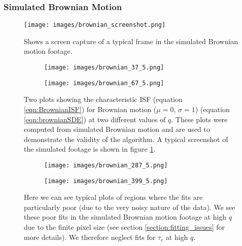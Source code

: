 \documentclass[10pt]{article}
\begin{document}
\subsubsection{Simulated Brownian Motion}
\begin{figure}[H]
  \centering
  \texttt{[image: images/brownian\_screenshot.png]}
  \caption{Shows a screen capture of a typical frame in the simulated Brownian motion footage.}
  \label{fig:simulated_brownian_screenshot}
\end{figure}

\begin{figure}[H]
\begin{subfigure}[t]{.47\textwidth}
  \centering
  \texttt{[image: images/brownian\_37\_5.png]}
  \label{fig:simulated_brownian1_37_5}
\end{subfigure}%
\hfill
\begin{subfigure}[t]{.47\textwidth}
  \centering
  \texttt{[image: images/brownian\_67\_5.png]}
 \label{fig:simulated_brownian1_67_5}
\end{subfigure}
\caption{Two plots showing the characteristic ISF (equation \ref{eqn:BrownianISF}) for Brownian motion ($\mu = 0$, $\sigma = 1$) (equation \ref{eqn:brownianSDE}) at two different values of $q$. These plots were computed from simulated Brownian motion and are used to demonstrate the validity of the algorithm. A typical screenshot of the simulated footage is shown in figure \ref{fig:simulated_brownian_screenshot}.}
\label{fig:simulated_brownian1}
\end{figure}

\begin{figure}[H]
\begin{subfigure}[t]{.5\textwidth}
  \centering
  \texttt{[image: images/brownian\_287\_5.png]}
  \label{fig:simulated_brownian1_37_5}
\end{subfigure}%
\hfill
\begin{subfigure}[t]{.5\textwidth}
  \centering
  \texttt{[image: images/brownian\_399\_5.png]}
 \label{fig:simulated_brownian1_67_5}
\end{subfigure}
\caption{Here we can see typical plots of regions where the fits are particularly poor (due to the very noisy nature of the data). We see these poor fits in the simulated Brownian motion footage at high $q$ due to the finite pixel size (see section \ref{section:fitting_issues} for more details). We therefore neglect fits for $\tau_c$ at high $q$.}
\label{fig:simulated_brownian_troubled}
\end{figure}
\end{document}

